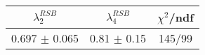 \begin{tabular}{c|c||c}
$\lambda_{2}^{RSB}$ & $\lambda_4^{RSB}$ & $\chi^{2}$/ndf \\
\hline
0.697 $\pm$ 0.065 & 0.81 $\pm$ 0.15 & 145/99\\
\end{tabular}
